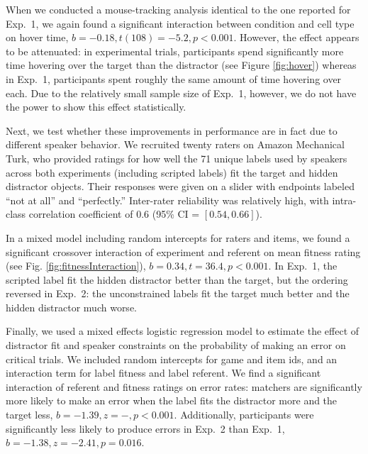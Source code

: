 \documentclass[10pt,letterpaper]{article}
\begin{document}
When we conducted a mouse-tracking analysis identical to the one reported for Exp.~1, we again found a significant interaction between condition and cell type on hover time, $b = -0.18, t(108) = -5.2, p < 0.001$. However, the effect appears to be attenuated: in experimental trials, participants spend significantly more time hovering over the target than the distractor (see Figure \ref{fig:hover}) whereas in Exp.~1, participants spent roughly the same amount of time hovering over each. Due to the relatively small sample size of Exp.~1, however, we do not have the power to show this effect statistically.

Next, we test whether these improvements in performance are in fact due to different speaker behavior. We recruited twenty raters on Amazon Mechanical Turk, who provided ratings for how well the 71 unique labels used by speakers across both experiments (including scripted labels) fit the target and hidden distractor objects. Their responses were given on a slider with endpoints labeled ``not at all'' and ``perfectly.''  Inter-rater reliability was relatively high, with intra-class correlation coefficient of $0.6$ (95\% CI = $[0.54, 0.66]$).

In a mixed model including random intercepts for raters and items, we found a significant crossover interaction of experiment and referent on mean fitness rating (see Fig. \ref{fig:fitnessInteraction}), $b = 0.34, t = 36.4, p < 0.001$. In Exp.~1, the scripted label fit the hidden distractor better than the target, but the ordering reversed in Exp.~2: the unconstrained labels fit the target much better and the hidden distractor much worse.

Finally, we used a mixed effects logistic regression model to estimate the effect of distractor fit and speaker constraints on the probability of making an error on critical trials. We included random intercepts for game and item ids, and an interaction term for label fitness and label referent. We find a significant interaction of referent and fitness ratings on error rates: matchers are significantly more likely to make an error when the label fits the distractor more and the target less, $b =-1.39, z = -, p < 0.001$. Additionally, participants were significantly less likely to produce errors in Exp.~2 than Exp.~1, $b = -1.38, z = -2.41, p = 0.016$.
\end{document}
